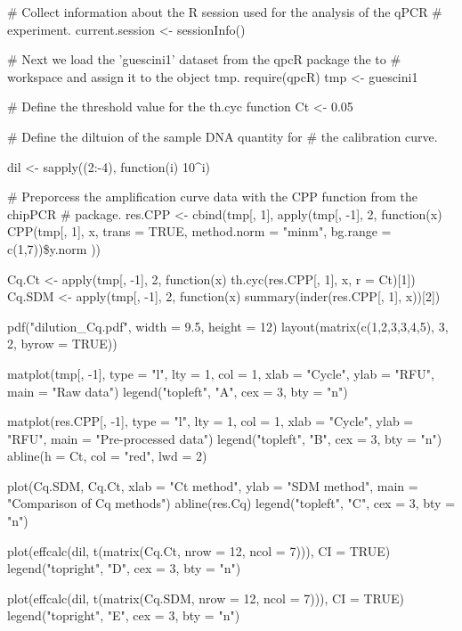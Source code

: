 \begin{example}
# Collect information about the R session used for the analysis of the qPCR
# experiment.
current.session <- sessionInfo()

# Next we load the 'guescini1' dataset from the qpcR package the to
# workspace and assign it to the object tmp.
require(qpcR)
tmp <- guescini1

# Define the threshold value for the th.cyc function
Ct <- 0.05

# Define the diltuion of the sample DNA quantity for
# the calibration curve.

dil <- sapply((2:-4), function(i) {10^i})

# Preporcess the amplification curve data with the CPP function from the chipPCR
# package.
res.CPP <- cbind(tmp[, 1], apply(tmp[, -1], 2, function(x) {
    CPP(tmp[, 1], x, trans = TRUE, method.norm = "minm", bg.range = c(1,7))\$y.norm
}))

Cq.Ct <- apply(tmp[, -1], 2, function(x) {th.cyc(res.CPP[, 1], x, r = Ct)[1]})
Cq.SDM <- apply(tmp[, -1], 2, function(x) {summary(inder(res.CPP[, 1], x))[2]})

pdf("dilution_Cq.pdf", width = 9.5, height = 12)
layout(matrix(c(1,2,3,3,4,5), 3, 2, byrow = TRUE))

matplot(tmp[, -1], type = "l", lty = 1, col = 1, xlab = "Cycle", 
	    ylab = "RFU", main = "Raw data")
legend("topleft", "A", cex = 3, bty = "n")

matplot(res.CPP[, -1], type = "l", lty = 1, col = 1, xlab = "Cycle", 
	ylab = "RFU", main = "Pre-processed data")
legend("topleft", "B", cex = 3, bty = "n")
abline(h = Ct, col = "red", lwd = 2)

plot(Cq.SDM, Cq.Ct, xlab = "Ct method", ylab = "SDM method", 
     main = "Comparison of Cq methods")
abline(res.Cq)
legend("topleft", "C", cex = 3, bty = "n")

plot(effcalc(dil, t(matrix(Cq.Ct, nrow = 12, ncol = 7))), CI = TRUE)
legend("topright", "D", cex = 3, bty = "n")

plot(effcalc(dil, t(matrix(Cq.SDM, nrow = 12, ncol = 7))), CI = TRUE)
legend("topright", "E", cex = 3, bty = "n")
\end{example}

